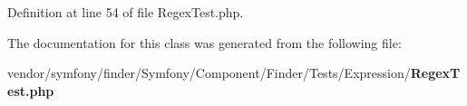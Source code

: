 Definition at line 54 of file Regex\+Test.\+php.



The documentation for this class was generated from the following file\+:\begin{DoxyCompactItemize}
\item 
vendor/symfony/finder/\+Symfony/\+Component/\+Finder/\+Tests/\+Expression/{\bf Regex\+Test.\+php}\end{DoxyCompactItemize}

